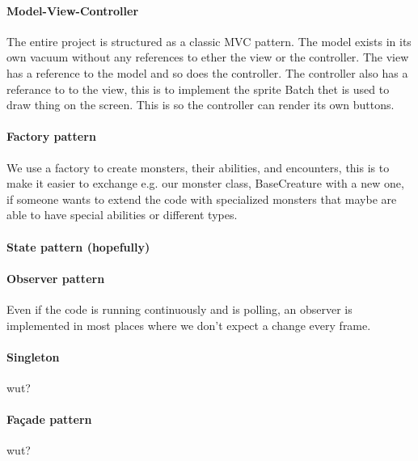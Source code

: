 \paragraph{Model-View-Controller\\}
The entire project is structured as a classic MVC pattern. The model exists in its own vacuum without any references to ether the view or the controller. The view has a reference to the model and so does the controller. The controller also has a referance to to the view, this is to implement the sprite Batch thet is used to draw thing on the screen. This is so the controller can render its own buttons.
\paragraph{Factory pattern\\}
We use a factory to create monsters, their abilities, and encounters, this is to make it easier to exchange e.g. our monster class, BaseCreature with a new one, if someone wants to extend the code with specialized monsters that maybe are able to have special abilities or different types.
\paragraph{State pattern (hopefully)\\}
\paragraph{Observer pattern\\}
Even if the code is running continuously and is polling, an observer is implemented in most places where we don't expect a change every frame.
\paragraph{Singleton\\}
wut?%
\paragraph{Façade pattern\\}
wut?%
